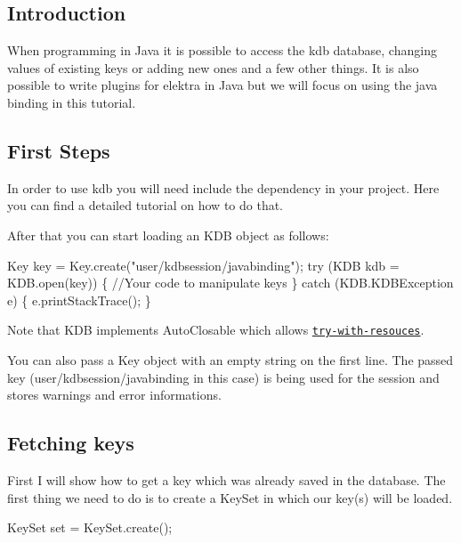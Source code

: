 \subsection*{Introduction}

When programming in Java it is possible to access the kdb database, changing values of existing keys or adding new ones and a few other things. It is also possible to write plugins for elektra in Java but we will focus on using the java binding in this tutorial.

\subsection*{First Steps}

In order to use {\ttfamily kdb} you will need include the dependency in your project. Here you can find a detailed tutorial on how to do that.

After that you can start loading an {\ttfamily K\+DB} object as follows\+:


\begin{DoxyCode}
Key key = Key.create(\textcolor{stringliteral}{"user/kdbsession/javabinding"});
\textcolor{keywordflow}{try} (KDB kdb = KDB.open(key)) \{
    \textcolor{comment}{//Your code to manipulate keys}
\} \textcolor{keywordflow}{catch} (KDB.KDBException e) \{
    e.printStackTrace();
\}
\end{DoxyCode}


Note that K\+DB implements {\ttfamily Auto\+Closable} which allows \href{https://docs.oracle.com/javase/tutorial/essential/exceptions/tryResourceClose.html}{\tt try-\/with-\/resouces}.

You can also pass a {\ttfamily Key} object with an empty string on the first line. The passed key ({\ttfamily user/kdbsession/javabinding} in this case) is being used for the session and stores warnings and error informations.

\subsection*{Fetching keys}

First I will show how to get a key which was already saved in the database. The first thing we need to do is to create a {\ttfamily Key\+Set} in which our key(s) will be loaded.


\begin{DoxyCode}
KeySet \textcolor{keyword}{set} = KeySet.create();
\end{DoxyCode}


